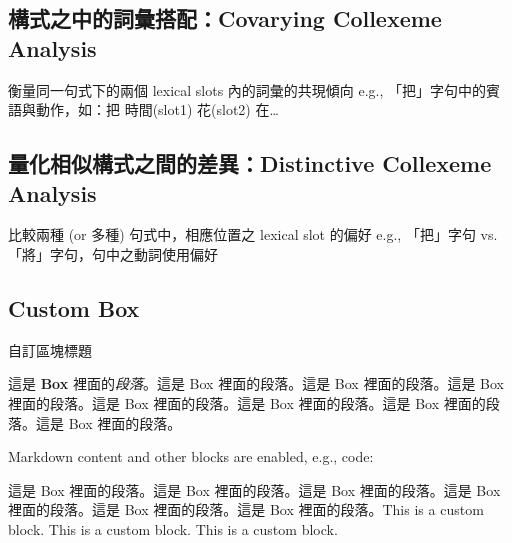 \hypertarget{ux69cbux5f0fux4e4bux4e2dux7684ux8a5eux5f59ux642dux914dcovarying-collexeme-analysis}{%
\subsection{構式之中的詞彙搭配：Covarying Collexeme
Analysis}\label{ux69cbux5f0fux4e4bux4e2dux7684ux8a5eux5f59ux642dux914dcovarying-collexeme-analysis}}

衡量同一句式下的兩個 lexical slots 內的詞彙的共現傾向 e.g.,
「把」字句中的賓語與動作，如：把 時間(slot1) 花(slot2) 在\ldots{}

\hypertarget{ux91cfux5316ux76f8ux4f3cux69cbux5f0fux4e4bux9593ux7684ux5deeux7570distinctive-collexeme-analysis}{%
\subsection{量化相似構式之間的差異：Distinctive Collexeme
Analysis}\label{ux91cfux5316ux76f8ux4f3cux69cbux5f0fux4e4bux9593ux7684ux5deeux7570distinctive-collexeme-analysis}}

比較兩種 (or 多種) 句式中，相應位置之 lexical slot 的偏好 e.g.,
「把」字句 vs.「將」字句，句中之動詞使用偏好

\hypertarget{custom-box}{%
\subsection{Custom Box}\label{custom-box}}

\begin{mybox}{自訂區塊標題}

這是 \textbf{Box} 裡面的\emph{段落}。這是 Box 裡面的段落。這是 Box
裡面的段落。這是 Box 裡面的段落。這是 Box 裡面的段落。這是 Box
裡面的段落。這是 Box 裡面的段落。這是 Box 裡面的段落。

Markdown content and other blocks are enabled, e.g., code:

\begin{Shaded}
\begin{Highlighting}[]
\NormalTok{(}\NormalTok{)}
\end{Highlighting}
\end{Shaded}

這是 Box 裡面的段落。這是 Box 裡面的段落。這是 Box 裡面的段落。這是 Box
裡面的段落。這是 Box 裡面的段落。這是 Box 裡面的段落。This is a custom
block. This is a custom block. This is a custom block.

\end{mybox}

